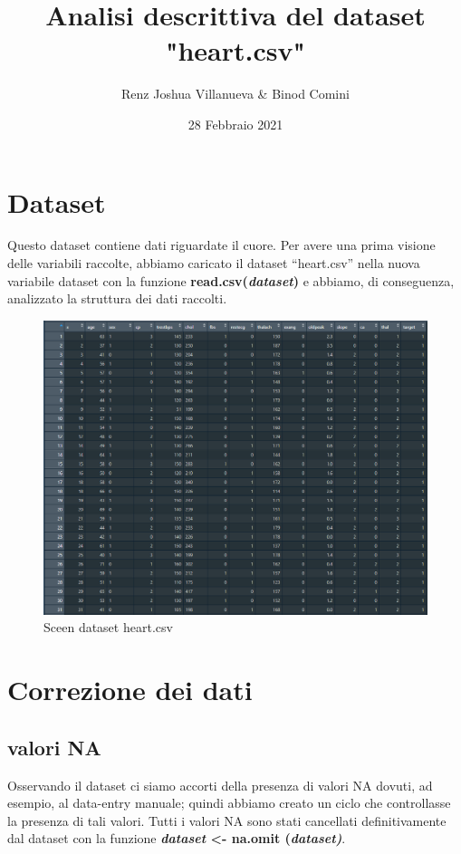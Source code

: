 \documentclass{article}
\begin{document}
\title{\Large{\textbf{Analisi descrittiva del dataset "heart.csv"}}}
\author{Renz Joshua Villanueva \& Binod Comini}
\date{28 Febbraio 2021}

\maketitle
\section{Dataset}
Questo dataset contiene dati riguardate il cuore.
Per avere una prima visione delle variabili raccolte, abbiamo caricato il dataset “heart.csv” nella nuova variabile dataset con la funzione \textbf{read.csv(\textit{dataset})} e abbiamo, di conseguenza, analizzato la struttura dei dati raccolti. \\
\begin{figure}[h]
	\centering
	\includegraphics[width=1\textwidth]{raw-heart.png}
	\caption{Sceen dataset heart.csv}
	\label {fig:ds1}
\end{figure}

\section{ Correzione dei dati }
\subsection{ valori NA }
Osservando il dataset ci siamo accorti della presenza di valori NA dovuti, ad esempio, al data-entry manuale; quindi abbiamo creato un ciclo che controllasse la presenza di tali valori. Tutti i valori NA sono stati cancellati definitivamente dal dataset con la funzione \textbf{\textit{dataset }\textless- na.omit (\textit{dataset)}}.
\end{document}

